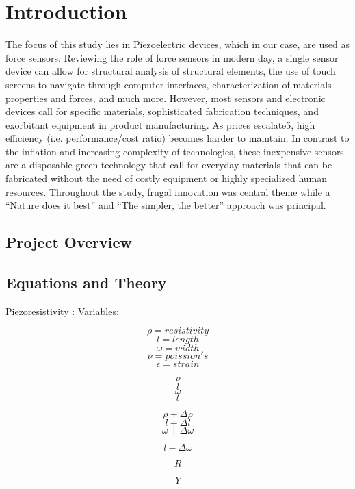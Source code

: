 \documentclass[12pt]{article}
\begin{document}
\section{Introduction}
The focus of this study lies in Piezoelectric devices, which in our case, are used as force sensors. Reviewing the role of force sensors in modern day, a single sensor device can allow for structural analysis of structural elements, the use of touch screens to navigate through computer interfaces, characterization of materials properties and forces, and much more. However, most sensors and electronic devices call for specific materials, sophisticated fabrication techniques, and exorbitant equipment in product manufacturing. As prices escalate5, high efficiency (i.e. performance/cost ratio) becomes harder to maintain. In contrast to the inflation and increasing complexity of technologies, these inexpensive sensors are a disposable green technology that call for everyday materials that can be fabricated without the need of costly equipment or highly specialized human resources. Throughout the study, frugal innovation was central theme while a “Nature does it best” and “The simpler, the better” approach was principal.



\pagebreak



\subsection{Project Overview}

\subsection{Equations and Theory}

Piezoresistivity      :
Variables:

$$\rho=resistivity$$
$$\textit{l}=length$$
$$\omega=width$$
$$\nu=poission's$$
$$\epsilon=strain$$


$$\rho$$
$$\textit{l}$$
$$\omega$$
$$\textit{t}$$


$$\rho+\Delta\rho$$
$$\textit{l}+\Delta\textit{l}$$
$$\omega+\Delta\omega$$

$$\textit{l}-\Delta\omega$$


$$R$$

$$Y$$
\end{document}
